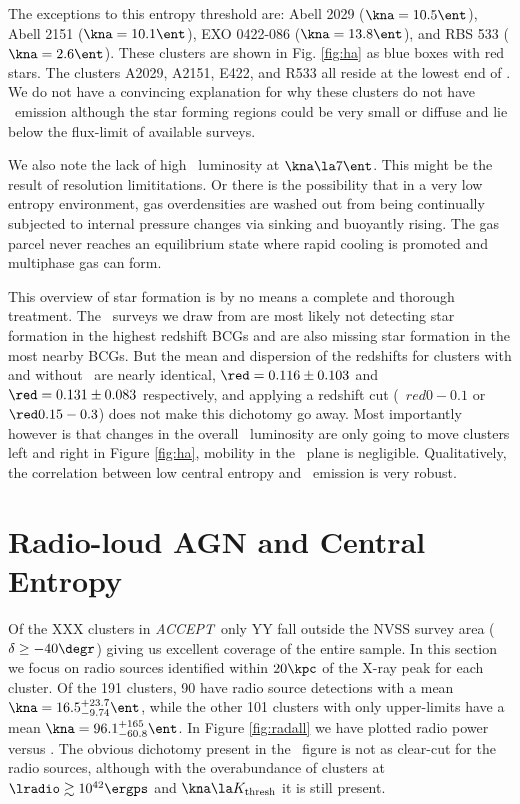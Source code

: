 \documentclass{emulateapj}
\newcommand{\accept}{\textit{ACCEPT}}
\begin{document}
The exceptions to this entropy threshold are: Abell 2029 ($\kna = 10.5
\ent$), Abell 2151 ($\kna = 10.1 \ent$), EXO 0422-086 ($\kna = 13.8
\ent$), and RBS 533 ($\kna = 2.6 \ent$). These clusters are shown in Fig.
\ref{fig:ha} as blue boxes with red stars. The clusters A2029, A2151,
E422, and R533 all reside at the lowest end of \lha. We do not have a
convincing explanation for why these clusters do not have \halpha\
emission although the star forming regions could be very small or
diffuse and lie below the flux-limit of available surveys.

We also note the lack of high \halpha\ luminosity at $\kna \la 7
\ent$. This might be the result of resolution limititations. Or there
is the possibility that in a very low entropy environment, gas
overdensities are washed out from being continually subjected to
internal pressure changes via sinking and buoyantly rising. The gas
parcel never reaches an equilibrium state where rapid cooling is
promoted and multiphase gas can form.

This overview of star formation is by no means a complete and thorough
treatment. The \halpha\ surveys we draw from are most likely not
detecting star formation in the highest redshift BCGs and are also
missing star formation in the most nearby BCGs. But the mean and
dispersion of the redshifts for clusters with and without \halpha\ are
nearly identical, $\red = 0.116 \pm 0.103$ and $\red = 0.131 \pm
0.083$ respectively, and applying a redshift cut (\ie\ $red 0-0.1$ or
$\red 0.15-0.3$) does not make this dichotomy go away. Most
importantly however is that changes in the overall \halpha\ luminosity
are only going to move clusters left and right in Figure \ref{fig:ha},
mobility in the \kna\ plane is negligible. Qualitatively, the
correlation between low central entropy and \halpha\ emission is very
robust.

\section{Radio-loud AGN and Central Entropy}
\label{sec:agn}

Of the XXX clusters in \accept\, only YY fall outside the NVSS survey
area ($\delta \geq -40\degr$) giving us excellent coverage of the
entire sample. In this section we focus on radio sources identified
within $20\kpc$ of the X-ray peak for each cluster. Of the 191
clusters, 90 have radio source detections with a mean $\kna =
16.5^{+23.7}_{-9.74} \ent$, while the other 101 clusters with
only upper-limits have a mean $\kna = 96.1^{+165}_{-60.8} \ent$. In
Figure \ref{fig:radall} we have plotted radio power versus \kna. The
obvious dichotomy present in the \halpha\ figure is not as clear-cut
for the radio sources, although with the overabundance of clusters at
$\lradio \gtrsim 10^{42} \ergps$ and $\kna \la \kthr$ it is still
present.
\end{document}
